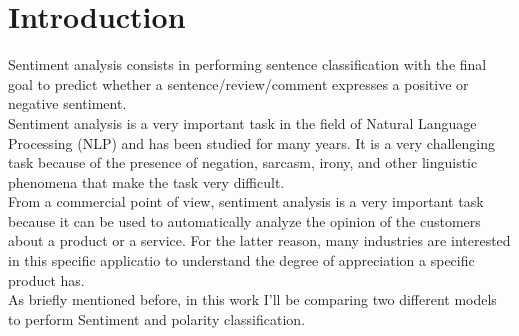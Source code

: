 \section{Introduction}
\label{sec:intro}
Sentiment analysis consists in performing sentence classification with the final goal to predict whether a sentence/review/comment expresses a positive or negative sentiment.\\ 
Sentiment analysis is a very important task in the field of Natural Language Processing (NLP) and has been studied for many years. It is a very challenging task because of the presence of negation, sarcasm, irony, and other linguistic phenomena that make the task very difficult.\\   
From a commercial point of view, sentiment analysis is a very important task because it can be used to automatically analyze the opinion of the customers about a product or a service. For the latter reason, many industries are interested in this specific applicatio to understand the degree of appreciation a specific product has.\\

As briefly mentioned before, in this work I'll be comparing two different models to perform Sentiment and polarity classification. 
